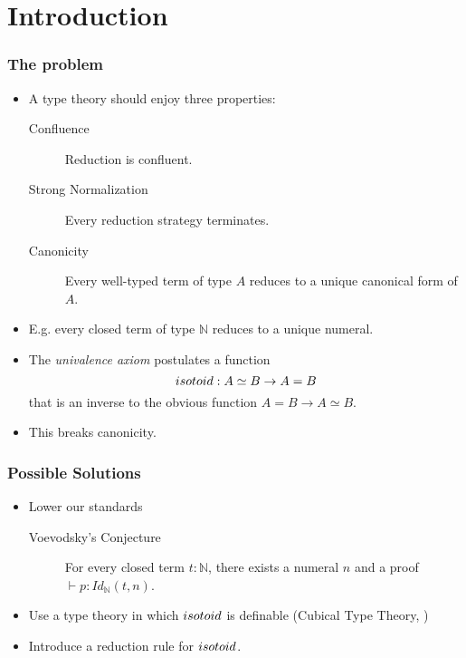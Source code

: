 \section{Introduction}

\begin{frame}
\frametitle{The problem}
\begin{itemize}[<+->]
\item
A type theory should enjoy three properties:
\begin{description}
\item[Confluence] Reduction is confluent.
\item[Strong Normalization] Every reduction strategy terminates.
\item[Canonicity] Every well-typed term of type $A$ reduces to a unique canonical form of $A$.
\end{description}
\item
E.g. every closed term of type $\mathbb{N}$ reduces to a unique numeral.
\item 
The \emph{univalence axiom} postulates a function
\[ isotoid : A \simeq B \rightarrow A = B \]
that is an inverse to the obvious function $A = B \rightarrow A \simeq B$.
\item
This breaks canonicity.
\end{itemize}
\end{frame}

\begin{frame}
\frametitle{Possible Solutions}
\begin{itemize}
\item
Lower our standards
\begin{description}
\item[Voevodsky's Conjecture]
For every closed term $t : \mathbb{N}$, there exists a numeral $n$ and a proof $\vdash p : Id_\mathbb{N}(t,n)$.
\end{description}
\item
Use a type theory in which $isotoid$ is definable (Cubical Type Theory, \cite{Polonsky14a}) %
\item
Introduce a reduction rule for $isotoid$.
\end{itemize}
\end{frame}

